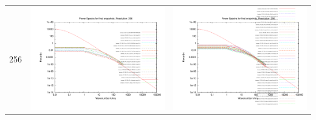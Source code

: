 \documentclass[a4paper,11pt,fleqn,oneside]{book}
\begin{document}
\begin{itemize}
\begin{table}
\begin{tabular}{l|c|c}
 256 & \includegraphics[scale=0.2]{analysis/powerspectra/fin_powspec_combined_256_h70.pdf} & \includegraphics[scale=0.2]{analysis/powerspectra/fin_powspec_combined_256_h100.pdf} \\

\end{tabular}
\end{table}
\end{itemize}
\end{document}
